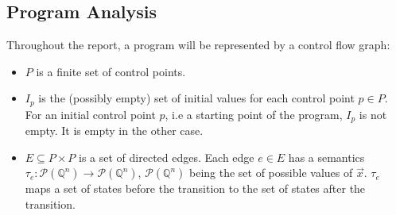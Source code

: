 \documentclass[a4paper,english,titlepage,11pt]{report}
\def\Q{\mathbb{Q}}
\def\P{\mathcal{P}}
\begin{document}
\subsection{Program Analysis}

Throughout the report, a program will be represented by a control flow graph:
\begin{itemize}
\item $P$ is a finite set of control points.
\item $I_p$ is the (possibly empty)
set of initial values for each control point $p \in P$. For an initial control
point $p$, i.e a starting point of the program, $I_p$ is not empty. It is empty
in the other case.
\item $E \subseteq  P \times P$ is a set of directed edges. Each edge $e \in E$
has a semantics $\tau_e: \P(\Q^n) \rightarrow \P(\Q^n)$, $\P(\Q^n)$ being the
set
of possible values of $\overrightarrow{x}$. $\tau_e$ maps a set of states before
the transition to the set of states after the transition.
\end{itemize}
\end{document}
